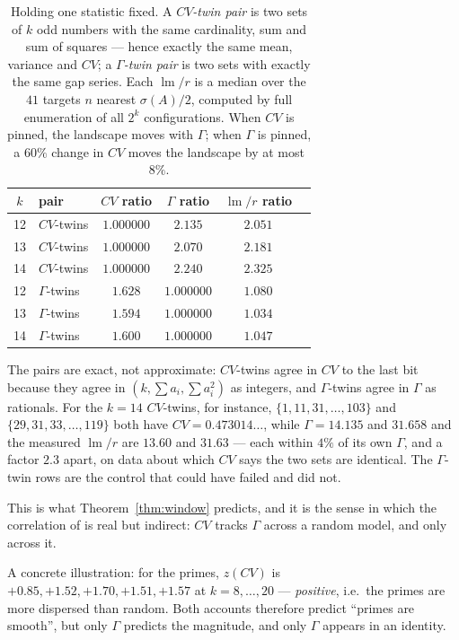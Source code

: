 \documentclass[11pt,a4paper]{article}
\theoremstyle{plain}
\theoremstyle{definition}
\theoremstyle{remark}
\DeclareMathOperator{\lm}{lm}
\begin{document}
\begin{table}[htbp]
\centering
\small
\begin{tabular}{clcccc}
\toprule
$k$ & pair & $CV$ ratio & $\Gamma$ ratio & $\lm/r$ ratio\\
\midrule
12 & $CV$-twins & $1.000000$ & $2.135$ & $2.051$\\
13 & $CV$-twins & $1.000000$ & $2.070$ & $2.181$\\
14 & $CV$-twins & $1.000000$ & $2.240$ & $2.325$\\
\midrule
12 & $\Gamma$-twins & $1.628$ & $1.000000$ & $1.080$\\
13 & $\Gamma$-twins & $1.594$ & $1.000000$ & $1.034$\\
14 & $\Gamma$-twins & $1.600$ & $1.000000$ & $1.047$\\
\bottomrule
\end{tabular}
\caption{Holding one statistic fixed. A \emph{$CV$-twin pair} is two sets of $k$
odd numbers with the same cardinality, sum and sum of squares --- hence exactly
the same mean, variance and $CV$; a \emph{$\Gamma$-twin pair} is two sets with
exactly the same gap series. Each $\lm/r$ is a median over the $41$ targets
$n$ nearest $\sigma(A)/2$, computed by full enumeration of all $2^{k}$
configurations. When $CV$ is pinned, the landscape moves with $\Gamma$; when
$\Gamma$ is pinned, a $60\%$ change in $CV$ moves the landscape by at most
$8\%$.}
\label{tab:twins}
\end{table}

The pairs are exact, not approximate: $CV$-twins agree in $CV$ to the last bit
because they agree in $(k,\sum a_i,\sum a_i^2)$ as integers, and $\Gamma$-twins
agree in $\Gamma$ as rationals. For the $k=14$ $CV$-twins, for instance,
$\{1,11,31,\dots,103\}$ and $\{29,31,33,\dots,119\}$ both have
$CV=0.473014\ldots$, while $\Gamma=14.135$ and $31.658$ and the measured
$\lm/r$ are $13.60$ and $31.63$ --- each within $4\%$ of its own $\Gamma$,
and a factor $2.3$ apart, on data about which $CV$ says the two sets are
identical. The $\Gamma$-twin rows are the control that could have failed and
did not.

This is what Theorem~\ref{thm:window} predicts, and it is the sense in which the
correlation of \cite{AR14} is real but indirect: $CV$ tracks $\Gamma$ across a
random model, and only across it.

A concrete illustration: for the primes, $z(CV)$ is
$+0.85,+1.52,+1.70,+1.51,+1.57$ at $k=8,\dots,20$ --- \emph{positive}, i.e.\ the
primes are more dispersed than random. Both accounts therefore predict ``primes
are smooth'', but only $\Gamma$ predicts the magnitude, and only $\Gamma$
appears in an identity.
\end{document}
